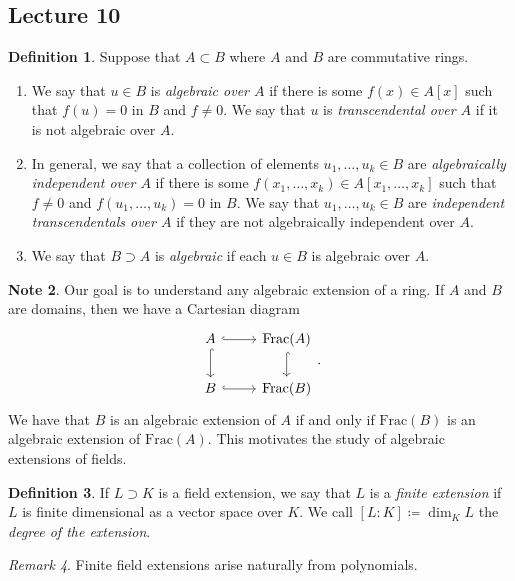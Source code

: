 \documentclass[10pt,letterpaper,cm]{nupset}
\theoremstyle{definition}
\newtheorem{definition}{Definition}[subsection]
\newtheorem{note}[definition]{Note}
\theoremstyle{theorem}
\theoremstyle{remark}
\newtheorem{remark}[definition]{Remark}
\newcommand{\1}{\mathbf{1}}
\newcommand{\0}{\vec 0}
\begin{document}
\subsection{Lecture 10}

\begin{definition} Suppose that $A \subset B$ where $A$ and $B$ are commutative rings. 
\begin{enumerate}
\item We say that $u \in B$ is \textit{algebraic over $A$} if there is some $f(x) \in A[x]$ such that $f(u) =0$ in $B$ and $f\ne 0$. We say that $u$ is \textit{transcendental over $A$} if it is not algebraic over $A$. 
\item In general, we say that a collection of elements $u_1, \ldots, u_k \in B$ are \textit{algebraically independent over $A$} if there is some $f(x_1, \ldots, x_k) \in A[x_1, \ldots, x_k]$ such that $f\ne 0$ and $f(u_1, \ldots, u_k) =0$ in $B$. We say that $u_1, \ldots, u_k \in B$ are \textit{independent transcendentals over $A$} if they are not algebraically independent over $A$.
\item We say that $B \supset A$ is \textit{algebraic} if each $u\in B$ is algebraic over $A$.
\end{enumerate}
\end{definition} 

\begin{note}
Our goal is to understand any algebraic extension of a ring. If $A$ and $B$ are domains, then we have a Cartesian diagram 
\[
\begin{tikzcd}
A \arrow[r, hook] \arrow[d, hook] & \text{Frac}(A) \arrow[d, hook] \\
B \arrow[r, hook]                 & \text{Frac}(B)                
\end{tikzcd}
.\] We have that $B$ is an algebraic extension of $A$ if and only if $\text{Frac}(B)$ is an algebraic extension of $\text{Frac}(A)$. This motivates the study of algebraic extensions of fields. 
\end{note}

\begin{definition}
If $L \supset K$ is a field extension, we say that $L$ is a \textit{finite extension} if $L$ is finite dimensional as a vector space over $K$. We call $[L: K]\coloneqq  \dim_K{L}$ the \textit{degree of the extension}.
\end{definition}

\begin{remark}
Finite field extensions arise naturally from polynomials. 
\end{remark}
\end{document}
